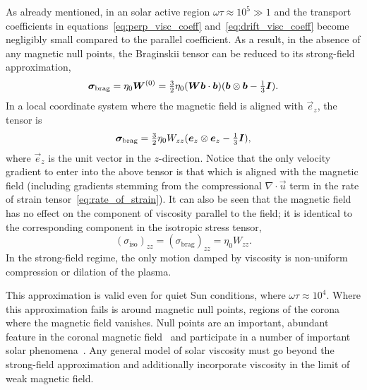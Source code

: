 As already mentioned, in an solar active region $\omega \tau \approx 10^5 \gg 1$ and the transport coefficients in equations~\eqref{eq:perp_visc_coeff} and~\eqref{eq:drift_visc_coeff} become negligibly small compared to the parallel coefficient. As a result, in the absence of any magnetic null points, the Braginskii tensor can be reduced to its strong-field approximation,
\begin{equation}
  \label{eq:strong_field_approx}
{\bm \sigma}_{\text{brag}} = \eta_0 {\bm W}^{(0)} = \tfrac{3}{2} \eta_0 ({\bm W} {\bm b} \cdot {\bm b}) ( {\bm b} \otimes {\bm b} - \tfrac{1}{3} {\bm I}).
\end{equation}
In a local coordinate system where the magnetic field is aligned with $\vec{e}_z$, the tensor is
\begin{equation}
  \label{eq:z_aligned_strong_field_approx}
{\bm \sigma}_{\text{brag}} = \tfrac{3}{2} \eta_0 W_{zz} ( {\bm e}_z \otimes {\bm e}_z - \tfrac{1}{3} {\bm I}),
\end{equation}
where $\vec{e}_z$ is the unit vector in the $z$-direction. Notice that the only velocity gradient to enter into the above tensor is that which is aligned with the magnetic field (including gradients stemming from the compressional $\nabla \cdot \vec{u}$ term in the rate of strain tensor~\eqref{eq:rate_of_strain}). It can also be seen that the magnetic field has no effect on the component of viscosity parallel to the field; it is identical to the corresponding component in the isotropic stress tensor,
\begin{equation}
  \label{eq:z_aligned_iso}
  (\sigma_{\text{iso}})_{zz} = (\sigma_{\text{brag}})_{zz} = \eta_0 W_{zz}.
\end{equation}
In the strong-field regime, the only motion damped by viscosity is non-uniform compression or dilation of the plasma. 

This approximation is valid even for quiet Sun conditions, where $\omega\tau \approx 10^4$. Where this approximation fails is around magnetic null points, regions of the corona where the magnetic field vanishes. Null points are an important, abundant feature in the coronal magnetic field~\cite{edwardsNullPointDistribution2015} and participate in a number of important solar phenomena~\cite{massonNATUREFLARERIBBONS2009,moreno-insertisPLASMAJETSERUPTIONS2013,barnesRelationshipCoronalMagnetic2007}. Any general model of solar viscosity must go beyond the strong-field approximation and additionally incorporate viscosity in the limit of weak magnetic field.

